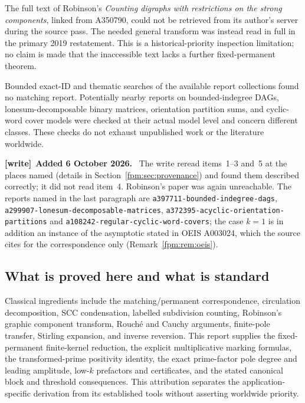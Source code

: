 \documentclass[11pt]{article}
\theoremstyle{definition}\newtheorem{definition}[theorem]{Definition}
\theoremstyle{remark}\newtheorem{remark}[theorem]{Remark}
\newcommand{\file}[1]{\nolinkurl{#1}}
\newenvironment{writenote}[1][]{\par\smallskip\begingroup\small
 \noindent\textbf{[write]}\if\relax\detokenize{#1}\relax\else~\textbf{#1.}\fi\ }%
 {\par\endgroup\smallskip}
\begin{document}
The full text of Robinson's \emph{Counting digraphs with restrictions on the strong components}, linked from A350790, could not be retrieved from its author's server during the source pass. The needed general transform was instead read in full in the primary 2019 restatement. This is a historical-priority inspection limitation; no claim is made that the inaccessible text lacks a further fixed-permanent theorem.

Bounded exact-ID and thematic searches of the available report collections found no matching report. Potentially nearby reports on bounded-indegree DAGs, lonesum-decomposable binary matrices, orientation partition sums, and cyclic-word cover models were checked at their actual model level and concern different classes. These checks do not exhaust unpublished work or the literature worldwide.

\begin{writenote}[Added 6 October 2026]
The write reread items~1--3 and~5 at the places named (details in
Section~\ref{fpm:sec:provenance}) and found them described correctly; it did
not read item~4. Robinson's paper was again unreachable. The reports named
in the last paragraph are \file{a397711-bounded-indegree-dags},
\file{a299907-lonesum-decomposable-matrices},
\file{a372395-acyclic-orientation-partitions} and
\file{a108242-regular-cyclic-word-covers}; the case $k=1$ is in addition an
instance of the asymptotic stated in OEIS A003024, which the source cites
for the correspondence only (Remark~\ref{fpm:rem:oeis}).
\end{writenote}

\subsection{What is proved here and what is standard}
Classical ingredients include the matching/permanent correspondence, circulation decomposition, SCC condensation, labelled subdivision counting, Robinson's graphic component transform, Rouch\'e and Cauchy arguments, finite-pole transfer, Stirling expansion, and inverse reversion. This report supplies the fixed-permanent finite-kernel reduction, the explicit multiplicative marking formulas, the transformed-prime positivity identity, the exact prime-factor pole degree and leading amplitude, low-$k$ prefactors and certificates, and the stated canonical block and threshold consequences. This attribution separates the application-specific derivation from its established tools without asserting worldwide priority.
\end{document}
